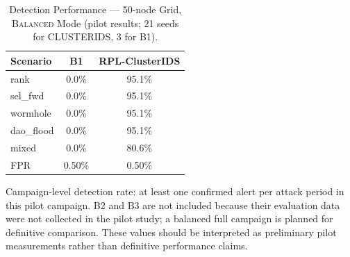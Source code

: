 \begin{table}[!t]
  \caption{Detection Performance — 50-node Grid, \textsc{Balanced} Mode (pilot results; 21 seeds for CLUSTERIDS, 3 for B1).}
  \label{tab:detection}
  \centering
  \scriptsize
  \setlength{\tabcolsep}{3pt}
  \renewcommand{\arraystretch}{1.1}
  \begin{tabular}{@{}lcc@{}}
    \toprule
    \textbf{Scenario} & \textbf{B1} & \textbf{RPL-ClusterIDS} \\
    \midrule
    rank     & 0.0\% & 95.1\% \\
    sel\_fwd & 0.0\% & 95.1\% \\
    wormhole & 0.0\% & 95.1\% \\
    dao\_flood & 0.0\% & 95.1\% \\
    mixed    & 0.0\% & 80.6\% \\
    \midrule
    FPR      & 0.50\% & 0.50\% \\
    \bottomrule
  \end{tabular}
  \vspace{2pt}
  \raggedright\scriptsize
\dag{} Campaign-level detection rate: at least one confirmed alert per attack period in this pilot campaign.
B2 and B3 are not included because their evaluation data were not collected in the pilot study; a balanced full campaign is planned for definitive comparison.
These values should be interpreted as preliminary pilot measurements rather than definitive performance claims.
\end{table}
